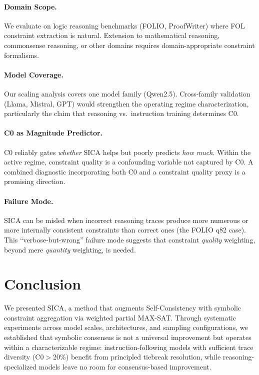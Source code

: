 \documentclass[11pt,a4paper]{article}
\begin{document}
\paragraph{Domain Scope.} We evaluate on logic reasoning benchmarks (FOLIO, ProofWriter) where FOL constraint extraction is natural. Extension to mathematical reasoning, commonsense reasoning, or other domains requires domain-appropriate constraint formalisms.

\paragraph{Model Coverage.} Our scaling analysis covers one model family (Qwen2.5). Cross-family validation (Llama, Mistral, GPT) would strengthen the operating regime characterization, particularly the claim that reasoning vs.\ instruction training determines C0.

\paragraph{C0 as Magnitude Predictor.} C0 reliably gates \emph{whether} SICA helps but poorly predicts \emph{how much}. Within the active regime, constraint quality is a confounding variable not captured by C0. A combined diagnostic incorporating both C0 and a constraint quality proxy is a promising direction.

\paragraph{Failure Mode.} SICA can be misled when incorrect reasoning traces produce more numerous or more internally consistent constraints than correct ones (the FOLIO q82 case). This ``verbose-but-wrong'' failure mode suggests that constraint \emph{quality} weighting, beyond mere \emph{quantity} weighting, is needed.

\section{Conclusion}
\label{sec:conclusion}

We presented SICA, a method that augments Self-Consistency with symbolic constraint aggregation via weighted partial MAX-SAT. Through systematic experiments across model scales, architectures, and sampling configurations, we established that symbolic consensus is not a universal improvement but operates within a characterizable regime: instruction-following models with sufficient trace diversity (C0$>$20\%) benefit from principled tiebreak resolution, while reasoning-specialized models leave no room for consensus-based improvement.
\end{document}
